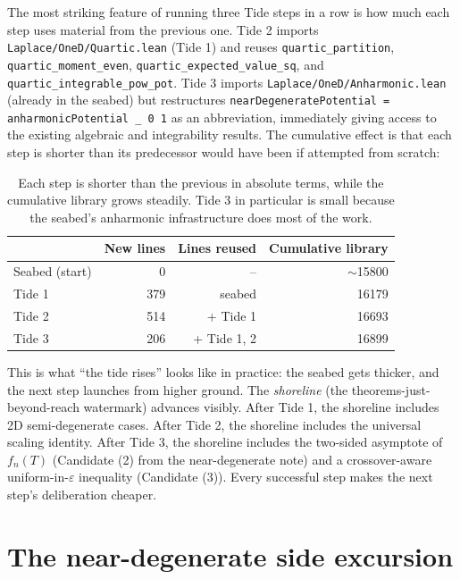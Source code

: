 \documentclass[11pt]{article}
\begin{document}
The most striking feature of running three Tide steps in a row is how
much each step uses material from the previous one. Tide 2 imports
\texttt{Laplace/OneD/Quartic.lean} (Tide 1) and reuses
\texttt{quartic\_partition}, \texttt{quartic\_moment\_even},
\texttt{quartic\_expected\_value\_sq}, and
\texttt{quartic\_integrable\_pow\_pot}. Tide 3 imports
\texttt{Laplace/OneD/Anharmonic.lean} (already in the seabed) but
restructures \texttt{nearDegeneratePotential = anharmonicPotential
\_ 0 1} as an abbreviation, immediately giving access to the existing
algebraic and integrability results. The cumulative effect is that
each step is shorter than its predecessor would have been if attempted
from scratch:

\begin{table}[h]
\centering
\renewcommand{\arraystretch}{1.2}
\begin{tabular}{l r r r}
\toprule
& \textbf{New lines} & \textbf{Lines reused} & \textbf{Cumulative library}\\
\midrule
Seabed (start)        &     0 & --      & $\sim$15800\\
Tide 1                &   379 & seabed  &  16179\\
Tide 2                &   514 & + Tide 1 &  16693\\
Tide 3                &   206 & + Tide 1, 2 & 16899\\
\bottomrule
\end{tabular}
\caption{Each step is shorter than the previous in absolute terms, while
the cumulative library grows steadily. Tide 3 in particular is small
because the seabed's anharmonic infrastructure does most of the work.}
\label{tab:lines}
\end{table}

This is what ``the tide rises'' looks like in practice: the seabed
gets thicker, and the next step launches from higher ground. The
\emph{shoreline} (the theorems-just-beyond-reach watermark) advances
visibly. After Tide 1, the shoreline includes 2D semi-degenerate cases.
After Tide 2, the shoreline includes the universal scaling identity.
After Tide 3, the shoreline includes the two-sided asymptote of
$f_n(T)$ (Candidate (2) from the near-degenerate note) and a
crossover-aware uniform-in-$\varepsilon$ inequality (Candidate (3)).
Every successful step makes the next step's deliberation cheaper.

\section{The near-degenerate side excursion}\label{sec:near-degenerate}
\end{document}
